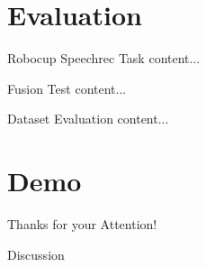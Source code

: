 \documentclass{beamer}
\begin{document}
	
	
	
	
	\section{Evaluation}
	
	\begin{frame}{Robocup Speechrec Task}
		content...
	\end{frame}
	
	\begin{frame}{Fusion Test}
		content...
	\end{frame}
	
	\begin{frame}{Dataset Evaluation}
		content...
	\end{frame}
	
	
	
	
	
	\section{Demo}
	
	
	
	
	
	\begin{frame}{}
		\begin{alertblock}{Thanks for your Attention!}
		\end{alertblock}
	\end{frame}
	
	\begin{frame}{}
		\begin{alertblock}{Discussion}
		\end{alertblock}
	\end{frame}
	
\end{document}

